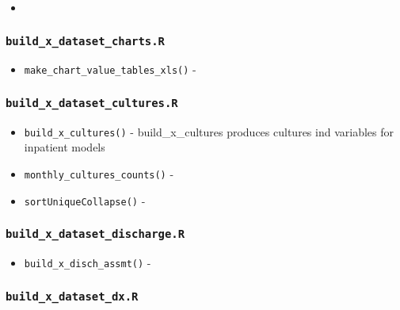 \documentclass[
]{book}
\providecommand{\tightlist}{%
  \setlength{\itemsep}{0pt}\setlength{\parskip}{0pt}}
\begin{document}
\begin{itemize}
\item
\end{itemize}

\hypertarget{build_x_dataset_charts.r}{%
\subsubsection{\texorpdfstring{\texttt{build\_x\_dataset\_charts.R}}{build\_x\_dataset\_charts.R}}\label{build_x_dataset_charts.r}}

\begin{itemize}
\tightlist
\item
  \texttt{make\_chart\_value\_tables\_xls()} -
\end{itemize}

\hypertarget{build_x_dataset_cultures.r}{%
\subsubsection{\texorpdfstring{\texttt{build\_x\_dataset\_cultures.R}}{build\_x\_dataset\_cultures.R}}\label{build_x_dataset_cultures.r}}

\begin{itemize}
\tightlist
\item
  \texttt{build\_x\_cultures()} - build\_x\_cultures produces cultures ind variables for inpatient models
\item
  \texttt{monthly\_cultures\_counts()} -
\item
  \texttt{sortUniqueCollapse()} -
\end{itemize}

\hypertarget{build_x_dataset_discharge.r}{%
\subsubsection{\texorpdfstring{\texttt{build\_x\_dataset\_discharge.R}}{build\_x\_dataset\_discharge.R}}\label{build_x_dataset_discharge.r}}

\begin{itemize}
\tightlist
\item
  \texttt{build\_x\_disch\_assmt()} -
\end{itemize}

\hypertarget{build_x_dataset_dx.r}{%
\subsubsection{\texorpdfstring{\texttt{build\_x\_dataset\_dx.R}}{build\_x\_dataset\_dx.R}}\label{build_x_dataset_dx.r}}
\end{document}
